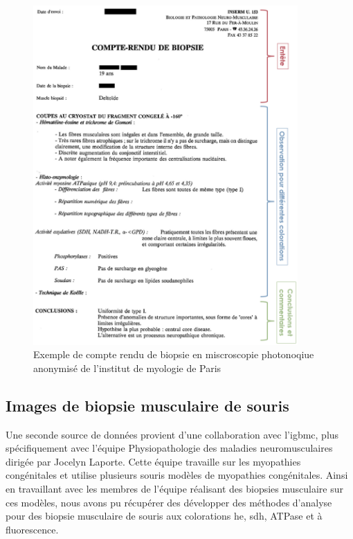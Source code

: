 \begin{figure}[!htbp]
 \centering
 \includegraphics[width=0.9\textwidth]{figures/compte_rendu_exemple.png}
 \caption[Exemple de compte rendu de biopsie]{Exemple de compte rendu de biopsie en miscroscopie photonoqiue anonymisé de l'institut de myologie de Paris}
 \label{fig:compte-rendu-exemple}
\end{figure}

\subsection{Images de biopsie musculaire de souris}
Une seconde source de données provient d'une collaboration avec l'\gls{igbmc}, plus spécifiquement avec l'équipe Physiopathologie des maladies neuromusculaires dirigée par Jocelyn Laporte. Cette équipe travaille sur les myopathies congénitales et utilise plusieurs souris modèles de myopathies congénitales. Ainsi en travaillant avec les membres de l'équipe réalisant des biopsies musculaire sur ces modèles, nous avons pu récupérer des développer des méthodes d'analyse pour des biopsie musculaire de souris aux colorations \gls{he}, \gls{sdh}, ATPase et à fluorescence.


